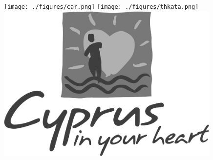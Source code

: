 \begin{columns}[T]
  \begin{column}{0.41\textwidth}
    
  \end{column}
  \begin{column}{0.01\textwidth}\end{column}
  \begin{column}{0.12\textwidth}
    \vspace{-0.5cm}
    \texttt{[image: ./figures/car.png]}
    \vspace{0.5cm}
    \texttt{[image: ./figures/thkata.png]}
    \vspace{0.2cm}
    \includegraphics[width=1.0\textwidth]{./figures/Cyprus-in-your-heart.png}
  \end{column}
  \begin{column}{0.01\textwidth}\end{column}
  \begin{column}{0.4\textwidth}
    
  \end{column}  
\end{columns}  


